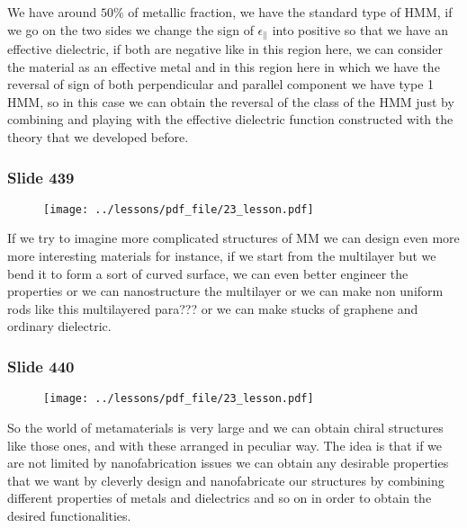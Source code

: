 \documentclass[../main/main.tex]{subfiles}
\begin{document}
We have around $50\%$ of metallic fraction, we have the standard type of HMM, if we go on the two sides we change the sign of $\epsilon_{\parallel}$ into positive so that we have an effective dielectric, if both are negative like in this region here, we can consider the material as an effective metal and in this region here in which we have the reversal of sign of both perpendicular and parallel component we have type 1 HMM, so in this case we can obtain the reversal of the class of the HMM just by combining and playing with the effective dielectric function constructed with the theory that we developed before.

\newpage

\subsubsection{Slide 439}

\begin{figure}[h!]
\centering
\texttt{[image: ../lessons/pdf\_file/23\_lesson.pdf]}
\end{figure}

If we try to imagine more complicated structures of MM we can design even more more interesting materials for instance, if we start from the multilayer but we bend it to form a sort of curved surface, we can even better engineer the properties or we can nanostructure the multilayer or we can make non uniform rods like this multilayered para??? or we can make stucks of graphene and ordinary dielectric. 

\newpage

\subsubsection{Slide 440}

\begin{figure}[h!]
\centering
\texttt{[image: ../lessons/pdf\_file/23\_lesson.pdf]}
\end{figure}

So the world of metamaterials is very large and we can obtain chiral structures like those ones, and with these arranged in peculiar way. The idea is that if we are not limited by nanofabrication issues we can obtain any desirable properties that we want by cleverly design and nanofabricate our structures by combining different properties of metals and dielectrics and so on in order to obtain the desired functionalities.
\end{document}
